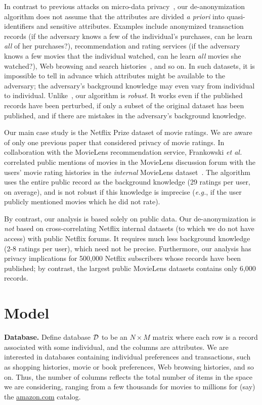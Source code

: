 \documentclass[11pt]{article}
\newcommand{\eg}{\emph{e.g.}}
\newcommand{\DD}{{\cal D}}
\begin{document}
In contrast to previous attacks on micro-data privacy~\cite{sweeney},
our de-anonymization algorithm does not assume that the attributes are
divided \emph{a priori} into quasi-identifiers and sensitive attributes.
Examples include anonymized transaction records (if the adversary
knows a few of the individual's purchases, can he learn \emph{all} of
her purchases?), recommendation and rating services (if the adversary
knows a few movies that the individual watched, can he learn \emph{all}
movies she watched?), Web browsing and search histories~\cite{aol},
and so on.  In such datasets, it is impossible to tell in advance
which attributes might be available to the adversary; the adversary's
background knowledge may even vary from individual to individual.
Unlike~\cite{sweeney,malin,lens}, our algorithm is \emph{robust}.
It works even if the published records have been perturbed, if only a
subset of the original dataset has been published, and if there are
mistakes in the adversary's background knowledge.

Our main case study is the Netflix Prize dataset of movie ratings.
We are aware of only one previous paper that considered privacy of movie
ratings.  In collaboration with the MovieLens recommendation service,
Frankowski \emph{et al.} correlated public mentions of movies in the
MovieLens discussion forum with the users' movie rating histories in the
\emph{internal} MovieLens dataset~\cite{lens}.  The algorithm uses the
entire public record as the background knowledge (29 ratings per user,
on average), and is not robust if this knowledge is imprecise (\eg,
if the user publicly mentioned movies which he did not rate).

By contrast, our analysis is based solely on public data.  Our
de-anonymization is \emph{not} based on cross-correlating Netflix internal
datasets (to which we do not have access) with public Netflix forums.
It requires much less background knowledge (2-8 ratings per user),
which need not be precise.  Furthermore, our analysis has privacy
implications for 500,000 Netflix subscribers whose records have been
published; by contrast, the largest public MovieLens datasets contains
only 6,000 records.



\section{Model}
\label{model}

\noindent
\textbf{Database.}
Define database $\DD$ to be an $N\times M$ matrix where each row is a record associated
with some individual, and the columns are attributes.  We are interested
in databases containing individual preferences and transactions, such as
shopping histories, movie or book preferences, Web browsing histories,
and so on.  Thus, the number of columns reflects the total number of
items in the space we are considering, ranging from a few thousands for
movies to millions for (say) the \url{amazon.com} catalog.
\end{document}
